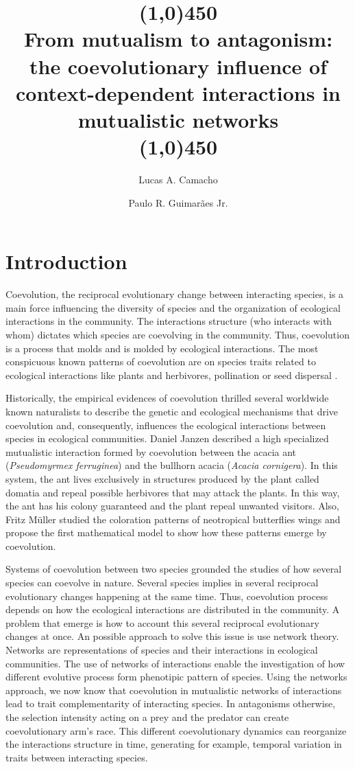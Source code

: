 \documentclass[a4paper, 12pt]{article}
\title{\vspace{-1.0cm} \line(1,0){450} \\From mutualism to antagonism: the coevolutionary influence of  context-dependent interactions in mutualistic networks\\\line(1,0){450}}
\author[1]{Lucas A. Camacho}
\author[2]{Paulo R. Guimarães Jr.}
\date{}
\affil[1,2]{Departamento de Ecologia, Universidade de São Paulo, Rua do Matão, travessa 14, nº 321, Cidade Universitária, São Paulo - SP, CEP: 05508-090, Brasil.}
\begin{document}
\begingroup
\linespread{1.0}
\maketitle
\endgroup

\section{Introduction}
\linenumbers
Coevolution, the reciprocal evolutionary change between interacting species, is a main force influencing the diversity of species and the organization of ecological interactions in the community. The interactions structure (who interacts with whom) dictates which species are coevolving in the community. Thus, coevolution is a process that molds and is molded by ecological interactions. The most conspicuous known patterns of coevolution are on species traits related to ecological interactions like plants and herbivores, pollination or seed dispersal \cite{tylianakis_global_2008}.

Historically, the empirical evidences of coevolution thrilled several worldwide known naturalists to describe the genetic and ecological mechanisms that drive coevolution and, consequently, influences the ecological interactions between species in ecological communities. Daniel Janzen described a high specialized mutualistic interaction formed by coevolution between the acacia ant (\textit{Pseudomyrmex ferruginea}) and the bullhorn acacia (\textit{Acacia cornigera}). In this system, the ant lives exclusively in structures produced by the plant called domatia and repeal possible herbivores that may attack the plants. In this way, the ant has his colony guaranteed and the plant repeal unwanted visitors. Also, Fritz Müller studied the coloration patterns of neotropical butterflies wings and propose the first mathematical model to show how these patterns emerge by coevolution.

Systems of coevolution between two species  grounded the studies of how several species can coevolve in nature. Several species implies in several reciprocal evolutionary changes happening at the same time. Thus, coevolution process depends on how the ecological interactions are distributed in the community. A problem that emerge is how to account this several reciprocal evolutionary changes at once. An possible approach to solve this issue is use network theory. Networks are representations of species and their interactions in ecological communities. The use of networks of interactions enable the investigation of how different evolutive process form phenotipic pattern of species. Using the networks approach, we now know that coevolution in mutualistic networks of interactions lead to trait complementarity of interacting species. In antagonisms otherwise, the selection intensity acting on a prey and the predator can create coevolutionary arm's race. This different coevolutionary dynamics can reorganize the interactions structure in time, generating for example, temporal variation in traits between interacting species.
\end{document}
